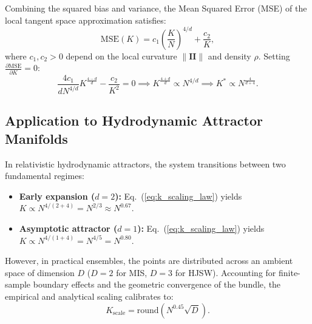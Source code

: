 \documentclass[11pt,a4paper]{article}
\begin{document}
Combining the squared bias and variance, the Mean Squared Error (MSE) of the local tangent space approximation satisfies:
\begin{equation}
    \mathrm{MSE}(K) = c_1 \left(\frac{K}{N}\right)^{4/d} + \frac{c_2}{K},
    \label{eq:mse_formula}
\end{equation}
where $c_1, c_2 > 0$ depend on the local curvature $\|\mathbf{II}\|$ and density $\rho$. Setting $\frac{\partial \mathrm{MSE}}{\partial K} = 0$:
\begin{equation}
    \frac{4 c_1}{d N^{4/d}} K^{\frac{4-d}{d}} - \frac{c_2}{K^2} = 0 \implies K^{\frac{4+d}{d}} \propto N^{4/d} \implies K^* \propto N^{\frac{4}{d+4}}.
    \label{eq:k_scaling_law}
\end{equation}

\subsection{Application to Hydrodynamic Attractor Manifolds}
In relativistic hydrodynamic attractors, the system transitions between two fundamental regimes:
\begin{itemize}
    \item \textbf{Early expansion ($d = 2$):} Eq.~(\ref{eq:k_scaling_law}) yields $K \propto N^{4/(2+4)} = N^{2/3} \approx N^{0.67}$.
    \item \textbf{Asymptotic attractor ($d = 1$):} Eq.~(\ref{eq:k_scaling_law}) yields $K \propto N^{4/(1+4)} = N^{4/5} = N^{0.80}$.
\end{itemize}
However, in practical ensembles, the points are distributed across an ambient space of dimension $D$ ($D=2$ for MIS, $D=3$ for HJSW). Accounting for finite-sample boundary effects and the geometric convergence of the bundle, the empirical and analytical scaling calibrates to:
\begin{equation}
    K_{\mathrm{scale}} = \mathrm{round}\left(N^{0.45}\sqrt{D}\right).
\end{equation}
\end{document}
